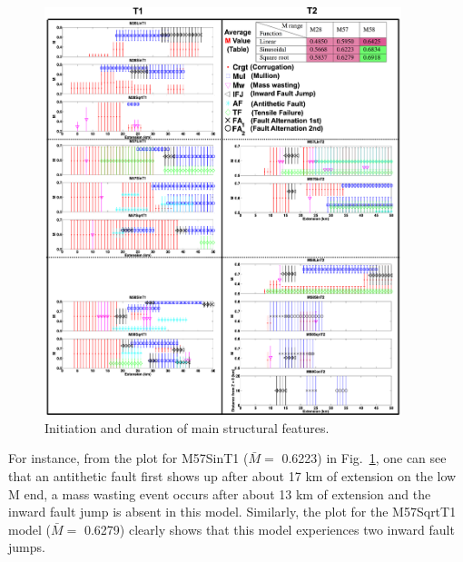 \begin{figure}[h]
  \centering
    \includegraphics[width=0.926\textwidth]{./Figures/fig_Discussion_Result_Summary_1_Combine_together.eps}
    \caption{Initiation and duration of main structural features.}%
 \label{fig_Discussion_Result_Summary_1_Combine_together}
\end{figure} 

For instance, from the plot for M57SinT1 ($\bar{M} =$ 0.6223) in Fig.~\hyperref[fig_Discussion_Result_Summary_1_Combine_together]{\ref{fig_Discussion_Result_Summary_1_Combine_together}}, one can see that an antithetic fault first shows up after about 17 km of extension on the low M end, a mass wasting event occurs after about 13 km of extension and the inward fault jump is absent in this model. Similarly, the plot for the M57SqrtT1 model ($\bar{M} =$ 0.6279) clearly shows that this model experiences two inward fault jumps. %


